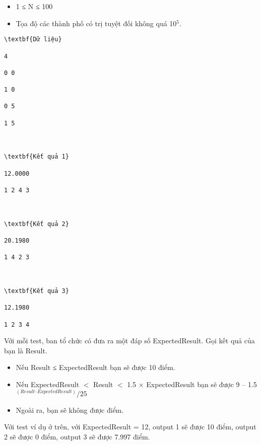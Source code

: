 \begin{itemize}
	\item 1 ≤ N ≤ 100
	\item Tọa độ các thành phố có trị tuyệt đối không quá 10$^5$.
\end{itemize}
\begin{verbatim}
\textbf{Dữ liệu}

4

0 0

1 0

0 5

1 5



\textbf{Kết quả 1}

12.0000

1 2 4 3	



\textbf{Kết quả 2}

20.1980

1 4 2 3	



\textbf{Kết quả 3}

12.1980

1 2 3 4

\end{verbatim}
Với mỗi test, ban tổ chức có đưa ra một đáp số ExpectedResult. Gọi kết quả của bạn là Result.
\begin{itemize}
	\item Nếu Result ≤ ExpectedResult bạn sẽ được 10 điểm.
	\item Nếu ExpectedResult $<$ Result $<$ 1.5 × ExpectedResult bạn sẽ được 9 – 1.5$^(Result – ExpectedResult) / 25$
	\item Ngoài ra, bạn sẽ không được điểm.
\end{itemize}

Với test ví dụ ở trên, với ExpectedResult = 12, output 1 sẽ được 10 điểm, output 2 sẽ được 0 điểm, output 3 sẽ được 7.997 điểm.